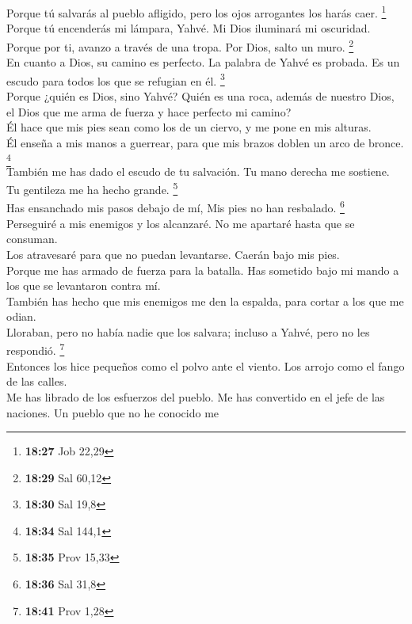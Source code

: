  Porque tú salvarás al pueblo afligido, pero los ojos
arrogantes los harás caer. \footnote{\textbf{18:27} Job 22,29}\\
 Porque tú encenderás mi lámpara, Yahvé. Mi Dios
iluminará mi oscuridad.\\
 Porque por ti, avanzo a través de una tropa. Por Dios,
salto un muro. \footnote{\textbf{18:29} Sal 60,12}\\
 En cuanto a Dios, su camino es perfecto. La palabra de
Yahvé es probada. Es un escudo para todos los que se refugian en él.
\footnote{\textbf{18:30} Sal 19,8}\\
 Porque ¿quién es Dios, sino Yahvé? Quién es una roca,
además de nuestro Dios,\\
 el Dios que me arma de fuerza y hace perfecto mi
camino?\\
 Él hace que mis pies sean como los de un ciervo, y me
pone en mis alturas.\\
 Él enseña a mis manos a guerrear, para que mis brazos
doblen un arco de bronce. \footnote{\textbf{18:34} Sal 144,1}\\
 También me has dado el escudo de tu salvación. Tu mano
derecha me sostiene. Tu gentileza me ha hecho grande. \footnote{\textbf{18:35}
  Prov 15,33}\\
 Has ensanchado mis pasos debajo de mí, Mis pies no han
resbalado. \footnote{\textbf{18:36} Sal 31,8}\\
 Perseguiré a mis enemigos y los alcanzaré. No me
apartaré hasta que se consuman.\\
 Los atravesaré para que no puedan levantarse. Caerán
bajo mis pies.\\
 Porque me has armado de fuerza para la batalla. Has
sometido bajo mi mando a los que se levantaron contra mí.\\
 También has hecho que mis enemigos me den la espalda,
para cortar a los que me odian.\\
 Lloraban, pero no había nadie que los salvara; incluso a
Yahvé, pero no les respondió. \footnote{\textbf{18:41} Prov 1,28}\\
 Entonces los hice pequeños como el polvo ante el viento.
Los arrojo como el fango de las calles.\\
 Me has librado de los esfuerzos del pueblo. Me has
convertido en el jefe de las naciones. Un pueblo que no he conocido me

